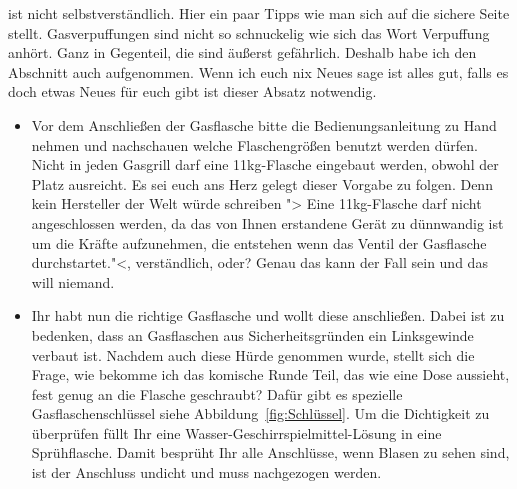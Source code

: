 	ist nicht selbstverständlich. 
	Hier ein paar Tipps wie man sich auf die 
	sichere Seite stellt. 
	Gasverpuffungen sind nicht so schnuckelig wie sich das Wort Verpuffung 
	anhört. Ganz in Gegenteil, die sind äußerst 
	gefährlich. Deshalb habe ich 
	den Abschnitt auch aufgenommen. Wenn ich euch nix Neues sage ist alles gut, 
	falls es doch etwas Neues für euch gibt ist dieser Absatz notwendig. 

	\begin{itemize}[noitemsep]
	\item Vor dem Anschließen der Gasflasche bitte die Bedienungsanleitung zu 
	Hand nehmen und nachschauen welche 
	Flaschengrößen benutzt 
	werden dürfen. Nicht in jeden Gasgrill darf eine 11kg-Flasche eingebaut 
	werden, obwohl der Platz ausreicht. Es sei 
	euch ans Herz gelegt dieser Vorgabe zu folgen. Denn kein Hersteller der 
	Welt würde schreiben "> Eine 11kg-Flasche darf 
	nicht 
	angeschlossen werden, da das von Ihnen erstandene Gerät zu dünnwandig 
	ist um die Kräfte aufzunehmen, die entstehen 
	wenn 
	das Ventil der Gasflasche durchstartet."<, verständlich, oder? Genau das kann
	der Fall sein und das will niemand.
	\item Ihr habt nun die richtige Gasflasche und wollt diese anschließen. 
	Dabei ist zu bedenken, dass an Gasflaschen aus 
	Sicherheitsgründen ein 
	Linksgewinde verbaut ist. Nachdem auch diese Hürde genommen wurde, 
	stellt sich die Frage, wie bekomme ich das 
	komische Runde Teil, 
	das wie eine Dose aussieht, fest genug an die Flasche geschraubt?  Dafür 
	gibt es spezielle Gasflaschenschlüssel siehe 	
	Abbildung~\vref{fig:Schlüssel}. Um die Dichtigkeit zu überprüfen füllt Ihr 
	eine Wasser-Geschirrspielmittel-Lösung in 
	eine Sprühflasche. 
	Damit besprüht Ihr alle Anschlüsse, wenn Blasen zu sehen sind, ist der 
	Anschluss undicht und muss nachgezogen werden.
	

\end{itemize}
